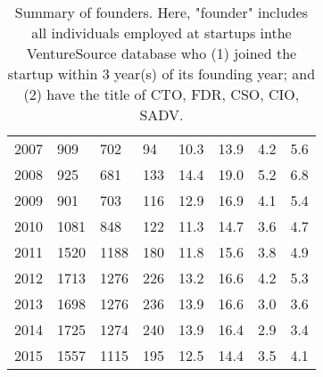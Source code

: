 \begin{table}[!htb]
\begin{tabular}{p{1.75cm}p{1.75cm}p{1.75cm}p{1.75cm}p{1.75cm}p{1.75cm}p{1.75cm}p{1.75cm}}
  2007 & 909 & 702 & 94 & 10.3 & 13.9 & 4.2 & 5.6 \\ 
  2008 & 925 & 681 & 133 & 14.4 & 19.0 & 5.2 & 6.8 \\ 
  2009 & 901 & 703 & 116 & 12.9 & 16.9 & 4.1 & 5.4 \\ 
  2010 & 1081 & 848 & 122 & 11.3 & 14.7 & 3.6 & 4.7 \\ 
  2011 & 1520 & 1188 & 180 & 11.8 & 15.6 & 3.8 & 4.9 \\ 
  2012 & 1713 & 1276 & 226 & 13.2 & 16.6 & 4.2 & 5.3 \\ 
  2013 & 1698 & 1276 & 236 & 13.9 & 16.6 & 3.0 & 3.6 \\ 
  2014 & 1725 & 1274 & 240 & 13.9 & 16.4 & 2.9 & 3.4 \\ 
  2015 & 1557 & 1115 & 195 & 12.5 & 14.4 & 3.5 & 4.1 \\ 
   \bottomrule
\end{tabular}
\endgroup
\caption{Summary of founders. Here, "founder" includes all individuals employed at startups inthe VentureSource database who (1) joined the startup within 3 year(s) of its founding year; and (2) have the title of CTO, FDR, CSO, CIO, SADV.} 
\label{table:GStable_technical}
\end{table}
